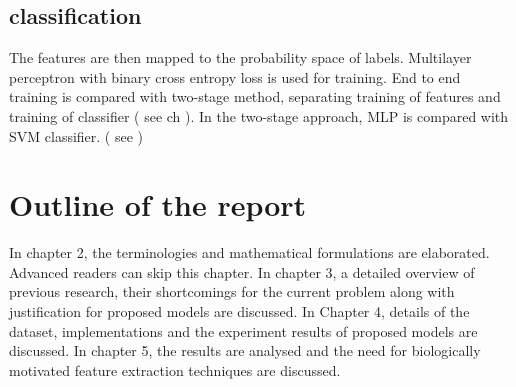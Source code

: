 \subsection{ classification }
The features are then mapped to the probability space of labels. Multilayer perceptron with binary cross entropy loss is used for training. End to end training is compared with two-stage method, separating  training of features and training of classifier ( see ch ). In the two-stage approach, MLP is compared with SVM classifier. ( see )




\section{Outline of the report}
In chapter 2, the terminologies and mathematical formulations are elaborated. Advanced readers can skip this chapter. In chapter 3, a detailed overview of previous research, their shortcomings for the current problem along with justification for proposed models are discussed. In Chapter 4, details of the dataset, implementations and the experiment results of proposed models are discussed. In chapter 5, the results are analysed and the need for biologically motivated feature extraction techniques are discussed. 






